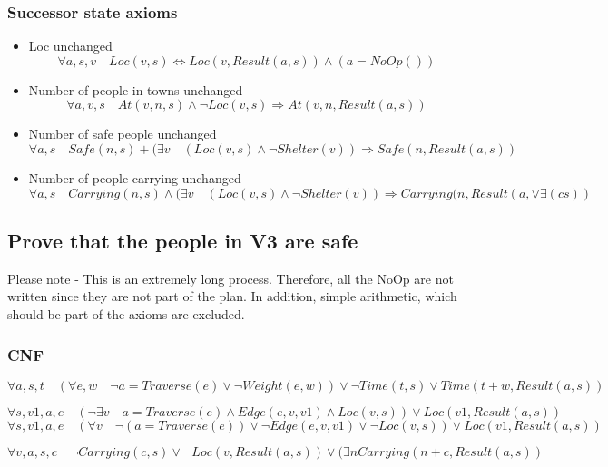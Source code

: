 \documentclass{article}                     %
\newcommand{\nt}[1]{\neg #1}
\begin{document}
	\subsubsection{Successor state axioms}
	\begin{itemize}
		\item Loc unchanged
		$$
		\forall a, s, v  \quad Loc(v, s) \Leftrightarrow Loc(v, Result(a, s)) \land (a = NoOp())
		$$
		
		\item Number of people in towns unchanged
		$$ \forall a, v, s\quad  At(v, n, s) \land \nt{Loc(v, s)} \Rightarrow At(v, n, Result(a, s)) $$
		
		\item Number of safe people unchanged
		$$ \forall a, s \quad   Safe(n, s) + (\exists v\quad (Loc(v, s) \land \neg Shelter(v) ) \Rightarrow Safe(n, Result(a, s))$$
		
		\item Number of people carrying unchanged
		$$ \forall a, s \quad Carrying(n, s) \land (\exists v \quad (Loc(v, s) \land \nt{Shelter(v)}) \Rightarrow  Carrying(n, Result(a, ∨ ∃(cs))$$
	\end{itemize}
	

	\subsection{Prove that the people in V3 are safe}

	Please note - This is an extremely long process. Therefore, all the NoOp are not written since they are not part of the plan. In addition, simple arithmetic, which should be part of the axioms are excluded. 
	\subsubsection{CNF}
	$$ 
	\forall a, s, t \quad  
	(\forall e, w \quad \neg a=Traverse(e) \lor \neg Weight(e, w)) \lor \neg Time(t, s)
	\lor 
	Time(t+w, Result(a, s))
	$$
	
	$$
	\forall s, v1, a, e \quad (\neg\exists v \quad a=Traverse(e) \land Edge(e, v, v1) \land Loc(v, s)) \lor Loc(v1, Result(a, s))
	$$
	\begin{equation}\label{key}
	\forall s, v1, a, e \quad (\forall v \quad \neg (a=Traverse(e)) \lor \neg Edge(e, v, v1) \lor \neg Loc(v, s)) \lor Loc(v1, Result(a, s))
	\end{equation}
	
	\begin{equation}\label{key}
	 \forall v, a, s, c \quad \neg Carrying(c, s) \lor \neg Loc(v, Result(a, s)) \lor (\exists n Carrying(n + c, Result(a, s)) 
	\end{equation}
	
\end{document}
